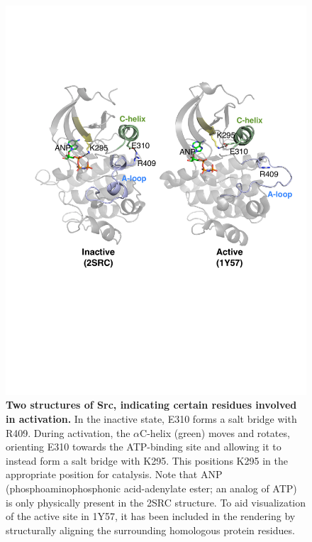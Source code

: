 \documentclass[aps,pre,twocolumn,nofootinbib,superscriptaddress,linenumbers]{revtex4-1}
\begin{document}

\begin{figure}[tb]
    \includegraphics[width=1.0\textwidth]{residue_pair_distances/src/src_ref_structures}

    \caption{{\bf Two structures of Src, indicating certain residues involved in activation.}
    In the inactive state, E310 forms a salt bridge with R409.
    During activation, the $\alpha$C-helix (green) moves and rotates, orienting E310 towards the ATP-binding site and allowing it to instead form a salt bridge with K295.
    This positions K295 in the appropriate position for catalysis.
    Note that ANP (phosphoaminophosphonic acid-adenylate ester; an analog of ATP) is only physically present in the 2SRC structure.
    To aid visualization of the active site in 1Y57, it has been included in the rendering by structurally aligning the surrounding homologous protein residues.
  }
  \label{figure:src-ref-structures}
\end{figure}
\end{document}
